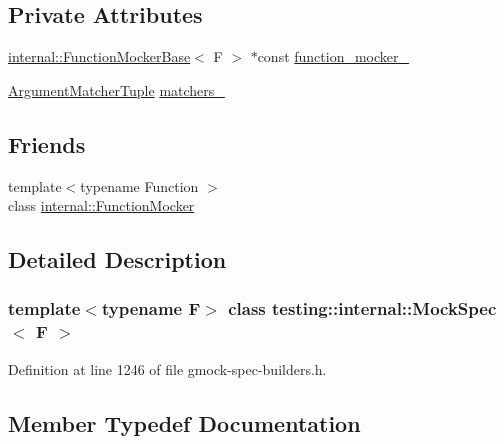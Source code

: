 \subsection*{Private Attributes}
\begin{DoxyCompactItemize}
\item 
\hyperlink{classtesting_1_1internal_1_1FunctionMockerBase}{internal\+::\+Function\+Mocker\+Base}$<$ F $>$ $\ast$const \hyperlink{classtesting_1_1internal_1_1MockSpec_a9dafaf30cc5ecfe824d1b92949e2054a}{function\+\_\+mocker\+\_\+}
\item 
\hyperlink{classtesting_1_1internal_1_1MockSpec_a35dc5836483cb8c6882c365c447b26cd}{Argument\+Matcher\+Tuple} \hyperlink{classtesting_1_1internal_1_1MockSpec_acb32a52e9244cfc33601de0fcc96aa2f}{matchers\+\_\+}
\end{DoxyCompactItemize}
\subsection*{Friends}
\begin{DoxyCompactItemize}
\item 
{\footnotesize template$<$typename Function $>$ }\\class \hyperlink{classtesting_1_1internal_1_1MockSpec_a6980863fff8693124aff79c507f87d45}{internal\+::\+Function\+Mocker}
\end{DoxyCompactItemize}


\subsection{Detailed Description}
\subsubsection*{template$<$typename F$>$\newline
class testing\+::internal\+::\+Mock\+Spec$<$ F $>$}



Definition at line 1246 of file gmock-\/spec-\/builders.\+h.



\subsection{Member Typedef Documentation}
\mbox{\label{classtesting_1_1internal_1_1MockSpec_a35dc5836483cb8c6882c365c447b26cd}} 
